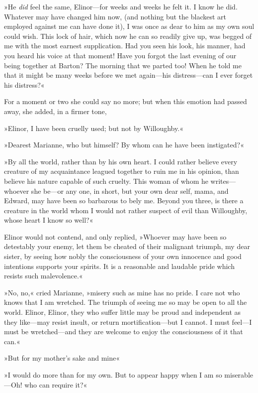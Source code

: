 »He \textit{did} feel the same, Elinor—for weeks and weeks he felt it. I know he did. Whatever may have changed him now, (and nothing but the blackest art employed against me can have done it), I was once as dear to him as my own soul could wish. This lock of hair, which now he can so readily give up, was begged of me with the most earnest supplication. Had you seen his look, his manner, had you heard his voice at that moment! Have you forgot the last evening of our being together at Barton? The morning that we parted too! When he told me that it might be many weeks before we met again—his distress—can I ever forget his distress?«

For a moment or two she could say no more; but when this emotion had passed away, she added, in a firmer tone,

»Elinor, I have been cruelly used; but not by Willoughby.«

»Dearest Marianne, who but himself? By whom can he have been instigated?«

»By all the world, rather than by his own heart. I could rather believe every creature of my acquaintance leagued together to ruin me in his opinion, than believe his nature capable of such cruelty. This woman of whom he writes—whoever she be—or any one, in short, but your own dear self, mama, and Edward, may have been so barbarous to bely me. Beyond you three, is there a creature in the world whom I would not rather suspect of evil than Willoughby, whose heart I know so well?«

Elinor would not contend, and only replied, »Whoever may have been so detestably your enemy, let them be cheated of their malignant triumph, my dear sister, by seeing how nobly the consciousness of your own innocence and good intentions supports your spirits. It is a reasonable and laudable pride which resists such malevolence.«

»No, no,« cried Marianne, »misery such as mine has no pride. I care not who knows that I am wretched. The triumph of seeing me so may be open to all the world. Elinor, Elinor, they who suffer little may be proud and independent as they like—may resist insult, or return mortification—but I cannot. I must feel—I must be wretched—and they are welcome to enjoy the consciousness of it that can.«

»But for my mother’s sake and mine\longdash«

»I would do more than for my own. But to appear happy when I am so miserable—Oh! who can require it?«

